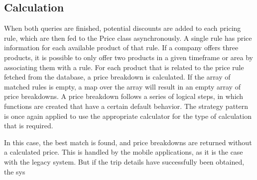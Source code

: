 \subsection{Calculation}
When both queries are finished, potential discounts are added to each pricing rule, which are then fed to the Price class asynchronously. A single rule has price information for each available product of that rule. If a company offers three products, it is possible to only offer two products in a given timeframe or area by associating them with a rule. For each product that is related to the price rule fetched from the database, a price breakdown is calculated. If the array of matched rules is empty, a map over the array will result in an empty array of price breakdowns. A price breakdown follows a series of logical steps, in which functions are created that have a certain default behavior. The strategy pattern is once again applied to use the appropriate calculator for the type of calculation that is required.




In this case, the best match is found, and price breakdowns are returned without a calculated price. This is handled by the mobile applications, as it is the case with the legacy system. But if the trip details have successfully been obtained, the sys

